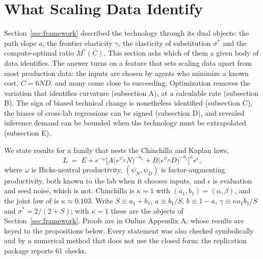 
\providecommand{\E}{\mathbb{E}}
\providecommand{\Var}{\operatorname{Var}}
\providecommand{\Cov}{\operatorname{Cov}}

\section{What Scaling Data Identify}\label{sec:ident}

Section~\ref{sec:framework} described the technology through its dual objects: the path slope $a$, the frontier
elasticity $\gamma$, the elasticity of substitution $\sigma^*$ and the compute-optimal ratio $M^*(C)$. This section
asks which of them a given body of data identifies. The answer turns on a feature that sets scaling data apart from
most production data: the inputs are chosen by agents who minimize a known cost, $C=6ND$, and many come close to
succeeding. Optimization removes the variation that identifies curvature (subsection A), at a calculable rate
(subsection B). The sign of biased technical change is nonetheless identified (subsection C), the biases of cross-lab
regressions can be signed (subsection D), and revealed inference demand can be bounded when the technology must be
extrapolated (subsection E).

We state results for a family that nests the Chinchilla and Kaplan laws,
\begin{equation}\label{eq:ident-family}
L \;=\; E + e^{-\omega}\Big[A\big(e^{\psi_N}N\big)^{-a_1} + B\big(e^{\psi_D}D\big)^{-b_1}\Big]^{\kappa}e^{\epsilon},
\end{equation}
where $\omega$ is Hicks-neutral productivity, $(\psi_N,\psi_D)$ is factor-augmenting productivity, both known to the lab
when it chooses inputs, and $\epsilon$ is evaluation and seed noise, which is not. Chinchilla is $\kappa=1$ with
$(a_1,b_1)=(\alpha,\beta)$, and the joint law of \citet{kaplan2020scaling} is $\kappa\approx0.103$. Write
$S\equiv a_1+b_1$, $a\equiv b_1/S$, $b\equiv1-a$, $\gamma\equiv\kappa a_1b_1/S$ and $\sigma^*=2/(2+S)$; with $\kappa=1$
these are the objects of Section~\ref{sec:framework}. Proofs are in Online Appendix A, whose results are keyed to the propositions below. Every statement was also checked
symbolically and by a numerical method that does not use the closed form; the replication package reports 61 checks.

